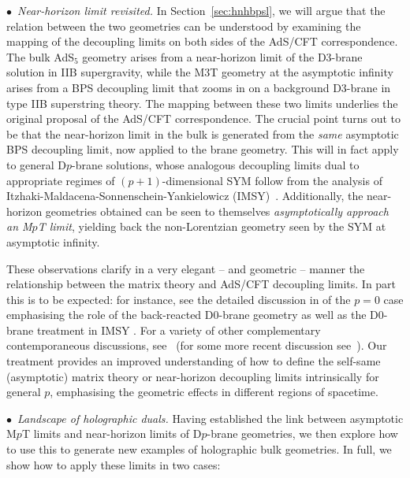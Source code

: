 \documentclass[11pt]{article}
\renewcommand{\emph}[1]{\textit{#1}}
\begin{document}
\noindent $\bullet$~\emph{Near-horizon limit revisited.} In Section~\ref{sec:hnhbpsl},
we will argue that
the relation between the two geometries can be understood by examining the mapping of the decoupling limits on both sides of the AdS/CFT correspondence. The bulk AdS${}_5$ geometry arises from a near-horizon limit of the D3-brane solution in IIB supergravity, while the M3T geometry at the asymptotic infinity arises from a BPS decoupling limit that zooms in on a background D3-brane in type IIB superstring theory. The mapping between these two limits underlies the original proposal of the AdS/CFT correspondence. 
The crucial point turns out to be that the near-horizon limit in the bulk is generated from the \emph{same} asymptotic BPS decoupling limit, now applied to the brane geometry.
This will in fact apply to general D$p$-brane solutions, whose analogous decoupling limits dual to appropriate regimes of $(p+1)$-dimensional SYM follow from the analysis of Itzhaki-Maldacena-Sonnenschein-Yankielowicz (IMSY)~\cite{Itzhaki:1998dd}.
Additionally, the near-horizon geometries obtained can be seen to themselves \emph{asymptotically approach an M$p$T limit}, yielding back the non-Lorentzian geometry seen by the SYM at asymptotic infinity.

These observations clarify in a very elegant -- and geometric -- manner the relationship between the matrix theory and AdS/CFT decoupling limits.
In part this is to be expected: for instance, see the detailed discussion in \cite{Polchinski:1999br} of the $p=0$ case emphasising the role of the back-reacted D0-brane geometry \cite{Hyun:1997zt,Balasubramanian:1997kd,Hyun:1998bi,Hyun:1998iq} as well as the D0-brane treatment in IMSY \cite{Itzhaki:1998dd}. For a variety of other complementary contemporaneous discussions, see~\cite{Boonstra:1997dy,
Hyun:1998bi,Hyun:1998iq,Li:1998jy,deAlwis:1998ki,Martinec:1998ja,Lifschytz:1998pk,Townsend:1998qp,Yoneya:1999bb, Chepelev:1999pm} (for some more recent discussion see~\cite{Biggs:2023sqw,Maldacena:2023acv}).
% 
Our treatment provides an improved understanding of how to define the self-same (asymptotic) matrix theory or near-horizon decoupling limits intrinsically for general $p$, emphasising the geometric effects in different regions of spacetime.
%


\vspace{3mm}

\noindent $\bullet$~\emph{Landscape of holographic duals.}
Having established the link between asymptotic M$p$T limits and near-horizon limits of D$p$-brane geometries, we then explore how to use this to generate new examples of holographic bulk geometries.
In full, we show how to apply these limits in two cases:
\end{document}
